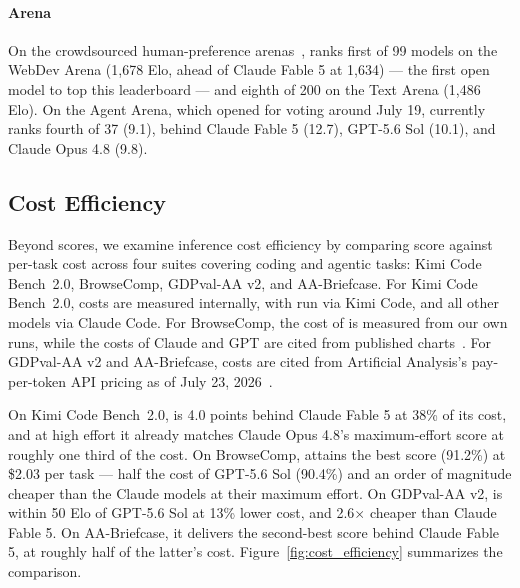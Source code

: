 \paragraph{Arena} On the crowdsourced human-preference arenas~\citep{lmarena},  ranks first of 99 models on the WebDev Arena (1{,}678 Elo, ahead of Claude Fable 5 at 1{,}634) --- the first open model to top this leaderboard --- and eighth of 200 on the Text Arena (1{,}486 Elo). On the Agent Arena, which opened for voting around July 19,  currently ranks fourth of 37 (9.1), behind Claude Fable 5 (12.7), GPT-5.6 Sol (10.1), and Claude Opus 4.8 (9.8).





\subsection{Cost Efficiency}
\label{sec:eval_cost}
Beyond scores, we examine inference cost efficiency by comparing score against per-task cost across four suites covering coding and agentic tasks: Kimi Code Bench~2.0, BrowseComp, GDPval-AA v2, and AA-Briefcase. For Kimi Code Bench~2.0, costs are measured internally, with  run via Kimi Code, and all other models via Claude Code. For BrowseComp, the cost of  is measured from our own runs, while the costs of Claude and GPT are cited from published charts~\citep{gpt56sol,claudesonnet5,claudesonnet5blog}. For GDPval-AA v2 and AA-Briefcase, costs are cited from Artificial Analysis's pay-per-token API pricing as of July 23, 2026~\citep{artificialanalysis}.

On Kimi Code Bench~2.0,  is 4.0 points behind Claude Fable 5 at 38\% of its cost, and at high effort it already matches Claude Opus 4.8's maximum-effort score at roughly one third of the cost. On BrowseComp,  attains the best score (91.2\%) at \$2.03 per task --- half the cost of GPT-5.6 Sol (90.4\%) and an order of magnitude cheaper than the Claude models at their maximum effort. On GDPval-AA v2,  is within 50 Elo of GPT-5.6 Sol at 13\% lower cost, and 2.6$\times$ cheaper than Claude Fable 5. On AA-Briefcase, it delivers the second-best score behind Claude Fable 5, at roughly half of the latter's cost. Figure~\ref{fig:cost_efficiency} summarizes the comparison.

